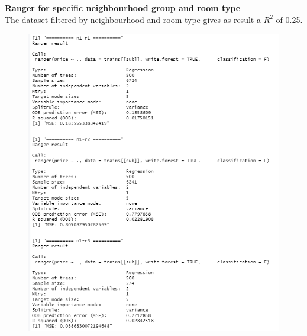 \documentclass{FR16}
\begin{document}
\noindent \textbf{Ranger for specific neighbourhood group and room type}\\
The dataset filtered by neighbourhood and room type gives as result a $R^2$ of 0.25.
\begin{figure}[!htb]
   \begin{minipage}{0.48\textwidth}
     \centering
     \includegraphics[width=1\linewidth]{figures/rgn2.1.png} 
   \end{minipage}\hfill
   \begin{minipage}{0.48\textwidth}
     \centering

\end{minipage}
\end{figure}
\end{document}
